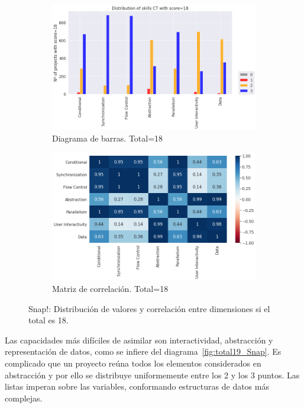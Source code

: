 \documentclass[a4paper, 12pt]{book}
\begin{document}
\begin{figure}[H]
    \centering
    \begin{subfigure}[h]{.49\textwidth} 
        \includegraphics[width=\textwidth]{img/distribucion_18_Snap}
        \caption{Diagrama de barras. Total=18}
        \label{fig:total18_Snap}
    \end{subfigure}       
    \begin{subfigure}[h]{.49\textwidth} 
        \includegraphics[width=\textwidth]{img/corr_18_Snap}
        \caption{Matriz de correlación. Total=18}
        \label{fig:corr18_Snap}
    \end{subfigure}
    \caption{Snap!: Distribución de valores y correlación entre dimensiones si el total es 18.}
\end{figure}

Las capacidades más difíciles de asimilar son interactividad, abstracción y representación de datos, como se infiere del diagrama~\ref{fig:total19_Snap}. Es complicado que un proyecto reúna todos los elementos considerados en abstracción y por ello se distribuye uniformemente entre los 2 y los 3 puntos. Las listas imperan sobre las variables, conformando estructuras de datos más complejas. 
\end{document}
